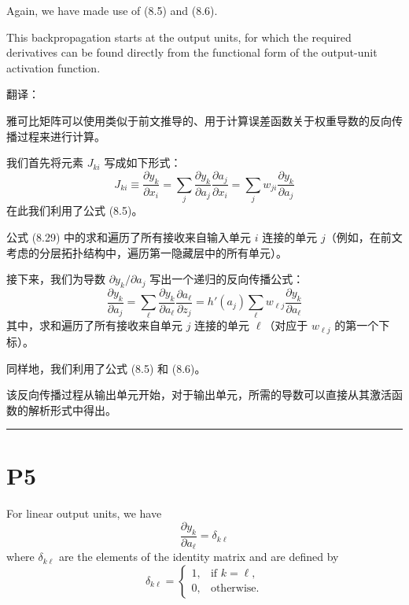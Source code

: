 \documentclass{article}
\begin{document}
Again, we have made use of (8.5) and (8.6). 

This backpropagation starts at the output units, for which the required derivatives can be found directly from the functional form of the output-unit activation function. 

{\color{red}
翻译：

雅可比矩阵可以使用类似于前文推导的、用于计算误差函数关于权重导数的反向传播过程来进行计算。

我们首先将元素 $J_{ki}$ 写成如下形式：
\begin{equation}
    J_{ki} \equiv \frac{\partial y_k}{\partial x_i} = \sum_j \frac{\partial y_k}{\partial a_j} \frac{\partial a_j}{\partial x_i} = \sum_j w_{ji} \frac{\partial y_k}{\partial a_j}
    \tag{8.29}
\end{equation}
在此我们利用了公式 (8.5)。

公式 (8.29) 中的求和遍历了所有接收来自输入单元 $i$ 连接的单元 $j$（例如，在前文考虑的分层拓扑结构中，遍历第一隐藏层中的所有单元）。

接下来，我们为导数 $\partial y_k / \partial a_j$ 写出一个递归的反向传播公式：
\begin{equation}
    \frac{\partial y_k}{\partial a_j} = \sum_\ell \frac{\partial y_k}{\partial a_\ell} \frac{\partial a_\ell}{\partial z_j} = h'(a_j) \sum_\ell w_{\ell j} \frac{\partial y_k}{\partial a_\ell}
    \tag{8.30}
\end{equation}
其中，求和遍历了所有接收来自单元 $j$ 连接的单元 $\ell$（对应于 $w_{\ell j}$ 的第一个下标）。

同样地，我们利用了公式 (8.5) 和 (8.6)。

该反向传播过程从输出单元开始，对于输出单元，所需的导数可以直接从其激活函数的解析形式中得出。
}

\noindent\rule{\linewidth}{0.4pt}

\section{P5}

For linear output units, we have
\begin{equation}
    \frac{\partial y_k}{\partial a_\ell} = \delta_{k\ell}
    \tag{8.31}
\end{equation}
where $\delta_{k\ell}$ are the elements of the identity matrix and are defined by
\begin{equation}
    \delta_{k\ell} =
    \begin{cases}
        1, & \text{if } k = \ell, \\
        0, & \text{otherwise}.
    \end{cases}
    \tag{8.32}
\end{equation}
\end{document}
